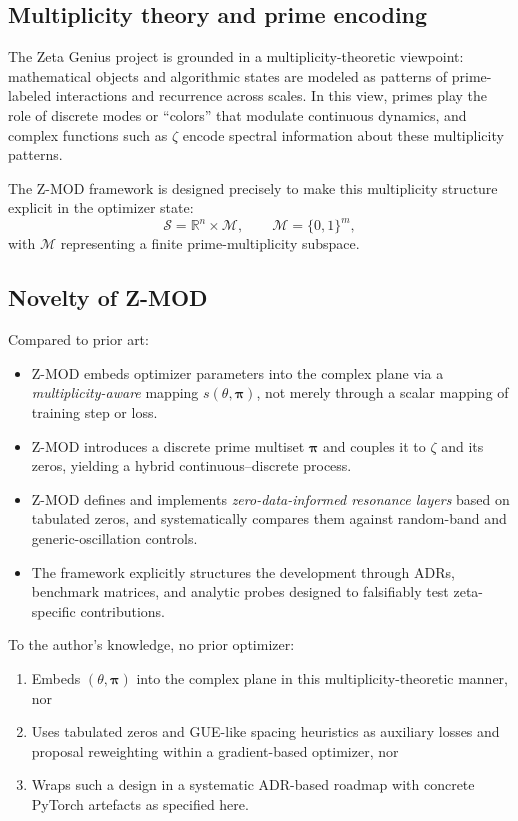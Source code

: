 \documentclass[11pt]{article}
\begin{document}
\subsection{Multiplicity theory and prime encoding}

The Zeta Genius project is grounded in a multiplicity-theoretic viewpoint: mathematical objects and algorithmic states are modeled as patterns of prime-labeled interactions and recurrence across scales. In this view, primes play the role of discrete modes or ``colors'' that modulate continuous dynamics, and complex functions such as $\zeta$ encode spectral information about these multiplicity patterns.

The Z-MOD framework is designed precisely to make this multiplicity structure explicit in the optimizer state:
\[
  \mathcal{S} = \mathbb{R}^n \times \mathcal{M}, \qquad \mathcal{M} = \{0,1\}^m,
\]
with $\mathcal{M}$ representing a finite prime-multiplicity subspace.

\subsection{Novelty of Z-MOD}

Compared to prior art:

\begin{itemize}[leftmargin=*]
  \item Z-MOD embeds optimizer parameters into the complex plane via a \emph{multiplicity-aware} mapping $s(\theta,\bm{\pi})$, not merely through a scalar mapping of training step or loss.
  \item Z-MOD introduces a discrete prime multiset $\bm{\pi}$ and couples it to $\zeta$ and its zeros, yielding a hybrid continuous--discrete process.
  \item Z-MOD defines and implements \emph{zero-data-informed resonance layers} based on tabulated zeros, and systematically compares them against random-band and generic-oscillation controls.
  \item The framework explicitly structures the development through ADRs, benchmark matrices, and analytic probes designed to falsifiably test zeta-specific contributions.
\end{itemize}

To the author's knowledge, no prior optimizer:

\begin{enumerate}
  \item Embeds $(\theta, \bm{\pi})$ into the complex plane in this multiplicity-theoretic manner, nor
  \item Uses tabulated zeros and GUE-like spacing heuristics as auxiliary losses and proposal reweighting within a gradient-based optimizer, nor
  \item Wraps such a design in a systematic ADR-based roadmap with concrete PyTorch artefacts as specified here.
\end{enumerate}
\end{document}
